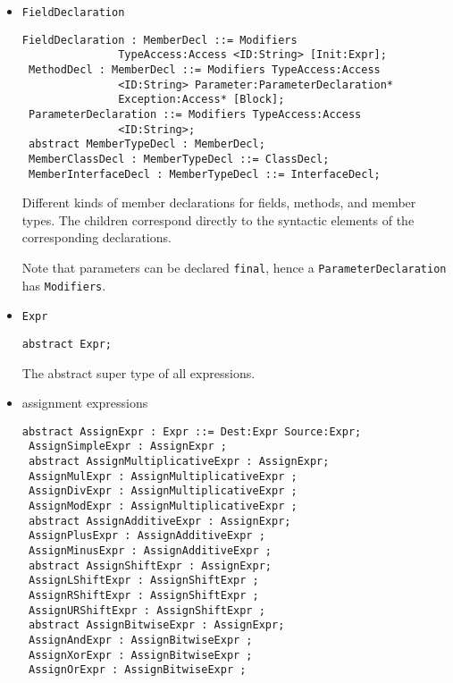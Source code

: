 \documentclass{article}
\newcommand{\nt}[1]{\texttt{#1}}
\newcommand{\child}[1]{\texttt{#1}}
\newcommand{\code}[1]{\lstinline$#1$}
\begin{document}
\begin{itemize}
\item %
  \nt{FieldDeclaration}
  \begin{lstlisting}[frame=single]
 FieldDeclaration : MemberDecl ::= Modifiers 
               TypeAccess:Access <ID:String> [Init:Expr];
 MethodDecl : MemberDecl ::= Modifiers TypeAccess:Access 
               <ID:String> Parameter:ParameterDeclaration* 
               Exception:Access* [Block];
 ParameterDeclaration ::= Modifiers TypeAccess:Access 
               <ID:String>;
 abstract MemberTypeDecl : MemberDecl;
 MemberClassDecl : MemberTypeDecl ::= ClassDecl;
 MemberInterfaceDecl : MemberTypeDecl ::= InterfaceDecl;
  \end{lstlisting}

  Different kinds of member declarations for fields, methods, and member types.
  The children correspond directly to the syntactic elements of the 
  corresponding declarations.

  Note that parameters can be declared \code{final}, hence
  a \nt{ParameterDeclaration} has \child{Modifiers}.





\item \nt{Expr}
  \begin{lstlisting}[frame=single]
 abstract Expr;
  \end{lstlisting}

  The abstract super type of all expressions.

\item assignment expressions
  \begin{lstlisting}[frame=single]
 abstract AssignExpr : Expr ::= Dest:Expr Source:Expr;
 AssignSimpleExpr : AssignExpr ;
 abstract AssignMultiplicativeExpr : AssignExpr;
 AssignMulExpr : AssignMultiplicativeExpr ;
 AssignDivExpr : AssignMultiplicativeExpr ;
 AssignModExpr : AssignMultiplicativeExpr ;
 abstract AssignAdditiveExpr : AssignExpr;
 AssignPlusExpr : AssignAdditiveExpr ;
 AssignMinusExpr : AssignAdditiveExpr ;
 abstract AssignShiftExpr : AssignExpr;
 AssignLShiftExpr : AssignShiftExpr ;
 AssignRShiftExpr : AssignShiftExpr ;
 AssignURShiftExpr : AssignShiftExpr ;
 abstract AssignBitwiseExpr : AssignExpr;
 AssignAndExpr : AssignBitwiseExpr ;
 AssignXorExpr : AssignBitwiseExpr ;
 AssignOrExpr : AssignBitwiseExpr ;
  \end{lstlisting}


\end{itemize}
\end{document}
